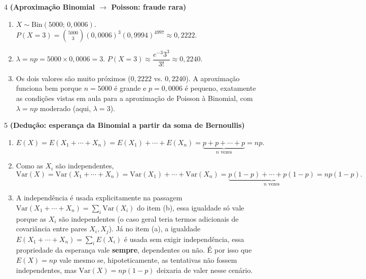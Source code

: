 \documentclass[11pt]{article}
\begin{document}
\begin{questao}{4} \textbf{(Aproximação Binomial $\to$ Poisson: fraude rara)}
\begin{solucao}
\begin{enumerate}[label=(\alph*)]
  \item $X\sim\text{Bin}(5000;\,0{,}0006)$. $P(X=3) = \binom{5000}{3}(0{,}0006)^3(0{,}9994)^{4997}
    \approx 0{,}2222$.
  \item $\lambda=np=5000\times0{,}0006=3$. $P(X=3)\approx \dfrac{e^{-3}3^3}{3!}\approx 0{,}2240$.
  \item Os dois valores são muito próximos ($0{,}2222$ vs. $0{,}2240$). A aproximação funciona bem
    porque $n=5000$ é grande e $p=0{,}0006$ é pequeno, exatamente as condições vistas em aula
    para a aproximação de Poisson à Binomial, com $\lambda=np$ moderado (aqui, $\lambda=3$).
\end{enumerate}
\end{solucao}
\end{questao}

\begin{questao}{5} \textbf{(Dedução: esperança da Binomial a partir da soma de Bernoullis)}
\begin{solucao}
\begin{enumerate}[label=(\alph*)]
  \item
  $$
  E(X) = E(X_1+\cdots+X_n) = E(X_1)+\cdots+E(X_n) = \underbrace{p+p+\cdots+p}_{n \text{ vezes}} = np.
  $$
  \item Como as $X_i$ são independentes,
  $$
  \mathrm{Var}(X) = \mathrm{Var}(X_1+\cdots+X_n) = \mathrm{Var}(X_1)+\cdots+\mathrm{Var}(X_n)
  = \underbrace{p(1-p)+\cdots+p(1-p)}_{n \text{ vezes}} = np(1-p).
  $$
  \item A independência é usada explicitamente na passagem
    $\mathrm{Var}(X_1+\cdots+X_n)=\sum_i\mathrm{Var}(X_i)$ do item (b), essa igualdade só vale
    porque as $X_i$ são independentes (o caso geral teria termos adicionais de covariância entre
    pares $X_i,X_j$). Já no item (a), a igualdade $E(X_1+\cdots+X_n)=\sum_i E(X_i)$ é usada sem
    exigir independência, essa propriedade da esperança vale \textbf{sempre}, dependentes ou não.
    É por isso que $E(X)=np$ vale mesmo se, hipoteticamente, as tentativas não fossem
    independentes, mas $\mathrm{Var}(X)=np(1-p)$ deixaria de valer nesse cenário.
\end{enumerate}
\end{solucao}
\end{questao}
\end{document}
